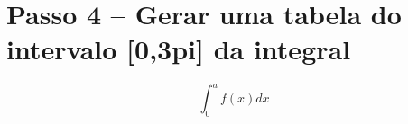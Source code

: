 \documentclass[11pt]{article}
\begin{document}
    \begin{center}
    \end{center}
    { \hspace*{\fill} \\}
    
    \begin{center}
    \end{center}
    { \hspace*{\fill} \\}
    
    \begin{center}
    \end{center}
    { \hspace*{\fill} \\}
    
    \begin{center}
    \end{center}
    { \hspace*{\fill} \\}
    
    \hypertarget{passo-4-gerar-uma-tabela-do-intervalo-03pi-da-integral}{%
\section{Passo 4 -- Gerar uma tabela do intervalo {[}0,3pi{]} da
integral}\label{passo-4-gerar-uma-tabela-do-intervalo-03pi-da-integral}}

    \begin{equation*}
\int_{0}^{a} f(x) dx
\end{equation*}
\end{document}
